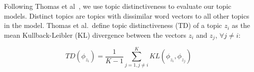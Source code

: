 Following Thomas et al~\cite{Thomas-etal:2011}, we use topic distinctiveness
to evaluate our topic models.
Distinct topics are topics with dissimilar word vectors to all other topics in the model.
Thomas et al.\ define topic distinctiveness (TD) of a topic $z_i$ as the mean
Kullback-Leibler (KL) divergence between the vectors $z_i$ and $z_j$, $\forall j \neq i$:

\begin{equation}
TD(\phi_{z_i}) = 
\frac{1}{K - 1}
\sum_{j=1,j \neq i}^{K}
KL(\phi_{z_i}, \phi_{z_j})
\label{eq:topicdistinctiveness}
\end{equation}

